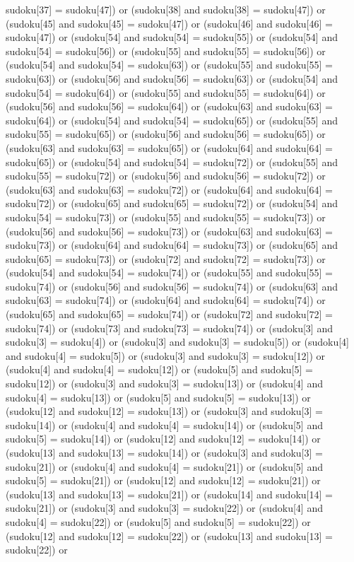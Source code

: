 \documentclass[8pt]{article}
\begin{document}
\begin{algorithm}[H]
sudoku[37] = sudoku[47]) or (sudoku[38]  and sudoku[38] = sudoku[47]) or (sudoku[45]  and sudoku[45] = sudoku[47]) or (sudoku[46]  and sudoku[46] = sudoku[47]) or (sudoku[54]  and sudoku[54] = sudoku[55]) or (sudoku[54]  and sudoku[54] = sudoku[56]) or (sudoku[55]  and sudoku[55] = sudoku[56]) or (sudoku[54]  and sudoku[54] = sudoku[63]) or (sudoku[55]  and sudoku[55] = sudoku[63]) or (sudoku[56]  and sudoku[56] = sudoku[63]) or (sudoku[54]  and sudoku[54] = sudoku[64]) or (sudoku[55]  and sudoku[55] = sudoku[64]) or (sudoku[56]  and sudoku[56] = sudoku[64]) or (sudoku[63]  and sudoku[63] = sudoku[64]) or (sudoku[54]  and sudoku[54] = sudoku[65]) or (sudoku[55]  and sudoku[55] = sudoku[65]) or (sudoku[56]  and sudoku[56] = sudoku[65]) or (sudoku[63]  and sudoku[63] = sudoku[65]) or (sudoku[64]  and sudoku[64] = sudoku[65]) or (sudoku[54]  and sudoku[54] = sudoku[72]) or (sudoku[55]  and sudoku[55] = sudoku[72]) or (sudoku[56]  and sudoku[56] = sudoku[72]) or (sudoku[63]  and sudoku[63] = sudoku[72]) or (sudoku[64]  and sudoku[64] = sudoku[72]) or (sudoku[65]  and sudoku[65] = sudoku[72]) or (sudoku[54]  and sudoku[54] = sudoku[73]) or (sudoku[55]  and sudoku[55] = sudoku[73]) or (sudoku[56]  and sudoku[56] = sudoku[73]) or (sudoku[63]  and sudoku[63] = sudoku[73]) or (sudoku[64]  and sudoku[64] = sudoku[73]) or (sudoku[65]  and sudoku[65] = sudoku[73]) or (sudoku[72]  and sudoku[72] = sudoku[73]) or (sudoku[54]  and sudoku[54] = sudoku[74]) or (sudoku[55]  and sudoku[55] = sudoku[74]) or (sudoku[56]  and sudoku[56] = sudoku[74]) or (sudoku[63]  and sudoku[63] = sudoku[74]) or (sudoku[64]  and sudoku[64] = sudoku[74]) or (sudoku[65]  and sudoku[65] = sudoku[74]) or (sudoku[72]  and sudoku[72] = sudoku[74]) or (sudoku[73]  and sudoku[73] = sudoku[74]) or (sudoku[3]  and sudoku[3] = sudoku[4]) or (sudoku[3]  and sudoku[3] = sudoku[5]) or (sudoku[4]  and sudoku[4] = sudoku[5]) or (sudoku[3]  and sudoku[3] = sudoku[12]) or (sudoku[4]  and sudoku[4] = sudoku[12]) or (sudoku[5]  and sudoku[5] = sudoku[12]) or (sudoku[3]  and sudoku[3] = sudoku[13]) or (sudoku[4]  and sudoku[4] = sudoku[13]) or (sudoku[5]  and sudoku[5] = sudoku[13]) or (sudoku[12]  and sudoku[12] = sudoku[13]) or (sudoku[3]  and sudoku[3] = sudoku[14]) or (sudoku[4]  and sudoku[4] = sudoku[14]) or (sudoku[5]  and sudoku[5] = sudoku[14]) or (sudoku[12]  and sudoku[12] = sudoku[14]) or (sudoku[13]  and sudoku[13] = sudoku[14]) or (sudoku[3]  and sudoku[3] = sudoku[21]) or (sudoku[4]  and sudoku[4] = sudoku[21]) or (sudoku[5]  and sudoku[5] = sudoku[21]) or (sudoku[12]  and sudoku[12] = sudoku[21]) or (sudoku[13]  and sudoku[13] = sudoku[21]) or (sudoku[14]  and sudoku[14] = sudoku[21]) or (sudoku[3]  and sudoku[3] = sudoku[22]) or (sudoku[4]  and sudoku[4] = sudoku[22]) or (sudoku[5]  and sudoku[5] = sudoku[22]) or (sudoku[12]  and sudoku[12] = sudoku[22]) or (sudoku[13]  and sudoku[13] = sudoku[22]) or 
\end{algorithm}
\end{document}
